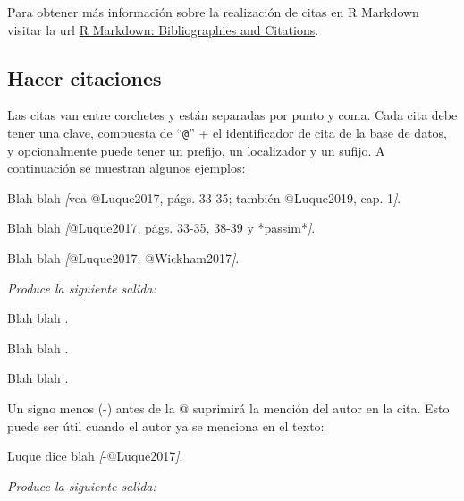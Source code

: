 \documentclass[12pt,a4paper,oneside,]{book}
\newenvironment{Shaded}{\begin{snugshade}}{\end{snugshade}}
\newcommand{\CommentTok}[1]{\textcolor[rgb]{0.56,0.35,0.01}{\textit{#1}}}
\newcommand{\NormalTok}[1]{#1}
\newcommand{\OtherTok}[1]{\textcolor[rgb]{0.56,0.35,0.01}{#1}}
\numberwithin{dummy}{section}
\theoremstyle{ocrenumbox}
\theoremstyle{blacknumex}
\theoremstyle{blacknumbox}
\theoremstyle{ocrenum}
\theoremstyle{ocrenum}
\begin{document}
\normalsize

Para obtener más información sobre la realización de citas en R Markdown
visitar la url
\href{https://rmarkdown.rstudio.com/authoring_bibliographies_and_citations.html}{R
Markdown: Bibliographies and Citations}.

\hypertarget{hacer-citaciones}{%
\subsection{Hacer citaciones}\label{hacer-citaciones}}

Las citas van entre corchetes y están separadas por punto y coma. Cada
cita debe tener una clave, compuesta de ``\texttt{@}'' + el
identificador de cita de la base de datos, y opcionalmente puede tener
un prefijo, un localizador y un sufijo. A continuación se muestran
algunos ejemplos:

\begin{Shaded}
\begin{Highlighting}[]
\NormalTok{Blah blah }\CommentTok{[}\OtherTok{vea @Luque2017, págs. 33{-}35; también @Luque2019, cap. 1}\CommentTok{]}\NormalTok{.}

\NormalTok{Blah blah }\CommentTok{[}\OtherTok{@Luque2017, págs. 33{-}35, 38{-}39 y *passim*}\CommentTok{]}\NormalTok{.}

\NormalTok{Blah blah }\CommentTok{[}\OtherTok{@Luque2017; @Wickham2017}\CommentTok{]}\NormalTok{.}
\end{Highlighting}
\end{Shaded}

\emph{Produce la siguiente salida:}

Blah blah \citetext{\citealp[vea][págs.
33-35]{Luque2017}; \citealp[también][cap. 1]{Luque2019}}.

Blah blah \citep[págs. 33-35, 38-39 y \emph{passim}]{Luque2017}.

Blah blah \citep{Luque2017, Wickham2017}.

Un signo menos (-) antes de la @ suprimirá la mención del autor en la
cita. Esto puede ser útil cuando el autor ya se menciona en el texto:

\begin{Shaded}
\begin{Highlighting}[]
\NormalTok{Luque dice blah }\CommentTok{[}\OtherTok{{-}@Luque2017}\CommentTok{]}\NormalTok{.}
\end{Highlighting}
\end{Shaded}

\emph{Produce la siguiente salida:}
\end{document}
